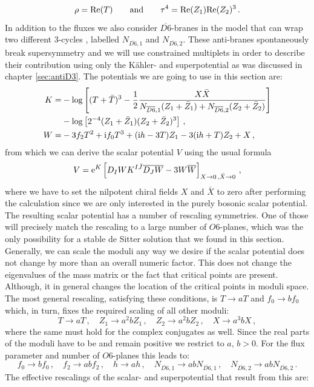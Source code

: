 \documentclass[a4paper,12pt,twoside,openright]{report}
\newcommand{\be}{\begin{equation}}
\newcommand{\ee}{\end{equation}}
\newcommand{\bea}{\begin{equation}\begin{aligned}}
\newcommand{\eea}{\end{aligned}\end{equation}}
\def\rmi{{\rm i}}
\def\rme{{\rm e}}
\def\rmre{{\rm Re}}
\begin{document}
\be 
\rho = \rmre(T) \qquad \text{and} \qquad \tau^4 = \rmre(Z_1) \rmre(Z_2)^ 3\,.
\ee
In addition to the fluxes we also consider $\overline{D6}$-branes in the model that can wrap two different $3$-cycles \cite{Kallosh:2018nrk}, labelled $N_{\overline{D6},1}$ and $N_{\overline{D6},2}$. These anti-branes spontaneously break supersymmetry and we will use constrained multiplets in order to describe their contribution using only the Kähler- and superpotential as was discussed in chapter \ref{sec:antiD3}. The potentials we are going to use in this section are:
\bea 
K =& -\log\left[(T+\bar{T})^ 3 - \frac{1}{2} \frac{X \bar{X}}{ N_{\overline{D6},1}(Z_1 + \bar{Z}_1) + N_{\overline{D6},2}(Z_2 + \bar{Z}_2)}\right] \\
&- \log\left[2^ {-4} (Z_1 + \bar{Z}_1)(Z_2 + \bar{Z}_2)^ 3\right]\,,\\
W =& -3 f_2 T^ 2 + \rmi f_0 T^ 3 + (\rmi h - 3T) Z_1 - 3(\rmi h+T)Z_2 + X\,,
\eea
from which we can derive the scalar potential $V$ using the usual formula
\be 
V = \rme^ K \left[D_I W K^ {I\bar{J}} \overline{D_J W} - 3 W \overline{W}\right]_{X\to 0\,,\bar{X} \to 0}\,,
\ee
where we have to set the nilpotent chiral fields $X$ and $\bar{X}$ to zero after performing the calculation since we are only interested in the purely bosonic scalar potential.\\
The resulting scalar potential has a number of rescaling symmetries. One of those will precisely match the rescaling to a large number of $O6$-planes, which was the only possibility for a stable de Sitter solution that we found in this section. Generally, we can scale the moduli any way we desire if the scalar potential does not change by more than an overall numeric factor. This does not change the eigenvalues of the mass matrix or the fact that critical points are present. Although, it in general changes the location of the critical points in moduli space. The most general rescaling, satisfying these conditions, is $T \to aT$ and $f_0 \to b f_0$ which, in turn, fixes the required scaling of all other moduli:
\be 
T\to aT\,, \quad Z_1 \to a^ 2 b Z_1\,, \quad Z_2 \to a^ 2 b Z_2\,,\quad X \to a^ 3 b X\,,
\ee
where the same must hold for the complex conjugates as well. Since the real parts of the moduli have to be and remain positive we restrict to $a,\,b>0$. For the flux parameter and number of $O6$-planes this leads to:
\be 
f_0 \to b f_0\,,\quad f_2 \to abf_2\,,\quad h\to ah\,,\quad N_{\overline{D6},1} \to ab N_{\overline{D6},1}\,,\quad N_{\overline{D6},2} \to ab N_{\overline{D6},2}\,.
\ee
The effective rescalings of the scalar- and superpotential that result from this are:
\end{document}
